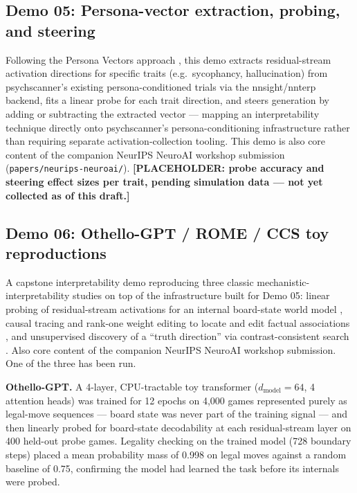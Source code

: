 \documentclass[11pt]{article}
\begin{document}
\subsection{Demo 05: Persona-vector extraction, probing, and steering}
\label{sec:demo05}

Following the Persona Vectors approach \citep{chen2025personavectors},
this demo extracts residual-stream activation directions for specific
traits (e.g.\ sycophancy, hallucination) from psychscanner's existing
persona-conditioned trials via the nnsight/nnterp backend, fits a linear
probe for each trait direction, and steers generation by adding or
subtracting the extracted vector — mapping an interpretability technique
directly onto psychscanner's persona-conditioning infrastructure rather
than requiring separate activation-collection tooling. This demo is also
core content of the companion NeurIPS NeuroAI workshop submission
(\texttt{papers/neurips-neuroai/}). \textbf{[PLACEHOLDER: probe accuracy
and steering effect sizes per trait, pending simulation data — not yet
collected as of this draft.]}

\subsection{Demo 06: Othello-GPT / ROME / CCS toy reproductions}
\label{sec:demo06}

A capstone interpretability demo reproducing three classic
mechanistic-interpretability studies on top of the infrastructure built for
Demo 05: linear probing of residual-stream activations for an internal
board-state world model \citep[Othello-GPT;][]{li2023othello}, causal
tracing and rank-one weight editing to locate and edit factual associations
\citep[ROME;][]{meng2022rome}, and unsupervised discovery of a
``truth direction'' via contrast-consistent search
\citep[CCS;][]{burns2023ccs}. Also core content of the companion NeurIPS
NeuroAI workshop submission. One of the three has been run.

\textbf{Othello-GPT.} A 4-layer, CPU-tractable toy transformer
($d_{\text{model}}=64$, 4 attention heads) was trained for 12 epochs on
4,000 games represented purely as legal-move sequences --- board state was
never part of the training signal --- and then linearly probed for
board-state decodability at each residual-stream layer on 400 held-out
probe games. Legality checking on the trained model (728 boundary steps)
placed a mean probability mass of 0.998 on legal moves against a random
baseline of 0.75, confirming the model had learned the task before its
internals were probed.
\end{document}
